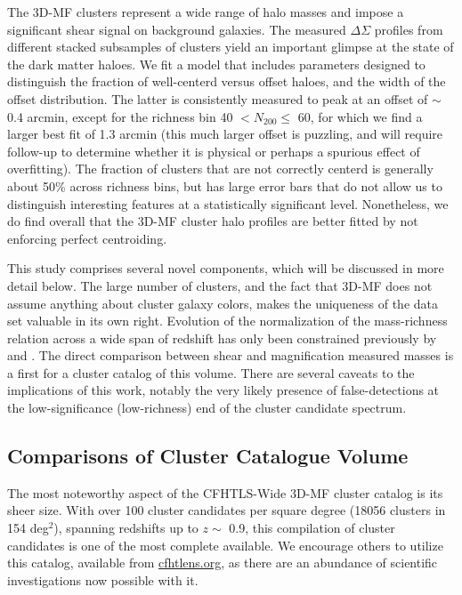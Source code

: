 The \ac{3D-MF} clusters represent a wide range of halo masses and impose a significant shear signal on background galaxies. The measured $\Delta \Sigma$ profiles from different stacked subsamples of clusters yield an important glimpse at the state of the dark matter haloes. We fit a model that includes parameters designed to distinguish the fraction of well-centerd versus offset haloes, and the width of the offset distribution. The latter is consistently measured to peak at an offset of $\sim$ 0.4 arcmin, except for the richness bin 40 $< N_{200} \leq$ 60, for which we find a larger best fit of 1.3 arcmin (this much larger offset is puzzling, and will require follow-up to determine whether it is physical or perhaps a spurious effect of overfitting). The fraction of clusters that are not correctly centerd is generally about 50\% across richness bins, but has large error bars that do not allow us to distinguish interesting features at a statistically significant level. Nonetheless, we do find overall that the \ac{3D-MF} cluster halo profiles are better fitted by not enforcing perfect centroiding.

This study comprises several novel components, which will be discussed in more detail below. The large number of clusters, and the fact that \ac{3D-MF} does not assume anything about cluster galaxy colors, makes the uniqueness of the data set valuable in its own right.  Evolution of the normalization of the mass-richness relation across a wide span of redshift has only been constrained previously by \citet{EdoThesis12} and \citet{Andreon14}. The direct comparison between shear and magnification measured masses is a first for a cluster catalog of this volume. There are several caveats to the implications of this work, notably the very likely presence of false-detections at the low-significance (low-richness) end of the cluster candidate spectrum.



\subsection{Comparisons of Cluster Catalogue Volume}

The most noteworthy aspect of the \ac{CFHTLS}-Wide \ac{3D-MF} cluster catalog is its sheer size. With over 100 cluster candidates per square degree (18056 clusters in 154 deg$^2$), spanning redshifts up to $z \sim$ 0.9, this compilation of cluster candidates is one of the most complete available. We encourage others to utilize this catalog, available from \url{cfhtlens.org}, as there are an abundance of scientific investigations now possible with it. 

